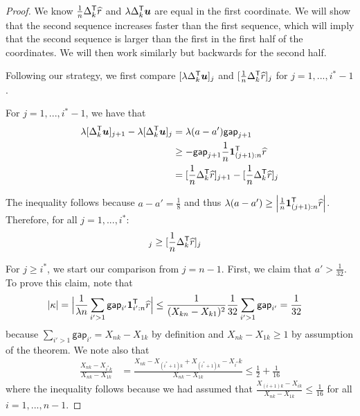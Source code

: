 \documentclass[12pt,pdftex,aos,noinfoline,addressasfootnote]{imsart}
\begin{document}
\begin{proof}
We know $\frac{1}{n} \Delta_k^{\mathsf{T}} \widehat{r}$ and $\lambda \Delta_k^{\mathsf{T}} \mbox{\boldmath $u$}$ are equal in the first coordinate. We will show that the second sequence increases faster than the first sequence, which will imply that the second sequence is larger than the first in the first half of the coordinates. We will then work similarly but backwards for the second half. 


Following our strategy, we first compare $[\lambda \Delta_k^{\mathsf{T}} \mbox{\boldmath $u$}]_j$ and $[\frac{1}{n} \Delta_k^{\mathsf{T}} \widehat{r}]_j$ for $j=1,..., i^*-1$.

For $j = 1,..., i^*-1$, we have that
\begin{align*}
\lambda [ \Delta_k^{\mathsf{T}} \mbox{\boldmath $u$}]_{j+1} - \lambda [ \Delta_k^{\mathsf{T}} \mbox{\boldmath $u$}]_{j} &= \lambda (a - a') \mathsf{gap}_{j+1} \\
 &\geq -\mathsf{gap}_{j+1} \frac{1}{n} \mbox{\boldmath $1$}_{(j+1):n}^{\mathsf{T}} \widehat{r} \\
& = [ \frac{1}{n} \Delta_k^{\mathsf{T}} \widehat{r} ]_{j+1} - [ \frac{1}{n} \Delta_k^{\mathsf{T}} \widehat{r} ]_{j}
\end{align*}

The inequality follows because $a - a' = \frac{1}{8}$ and thus $\lambda (a - a') \geq \left| \frac{1}{n} \mbox{\boldmath $1$}_{(j+1):n}^{\mathsf{T}} \widehat{r} \right|$. Therefore, for all $j = 1,...,i^*$:
\begin{align*}
[ \lambda \Delta_k^\tran \mathbf{u}]_j &\geq [ \frac{1}{n} \Delta_k^\tran \hat{r} ]_j
\end{align*}

For $j \geq i^*$, we start our comparison from $j=n-1$. First, we claim that $a' > \frac{1}{32}$. To prove this claim, note that
\begin{align}
|\kappa| &= \Big|\frac{1}{\lambda n} \sum_{i' > 1} \mathsf{gap}_{i'} \mbox{\boldmath $1$}_{i':n}^{\mathsf{T}} \widehat{r}\Big| \leq \frac{1}{(X_{kn} - X_{k1})^2}\frac{1}{32} \sum_{i' > 1} \mathsf{gap}_{i'} 
 = \frac{1}{32} 
\end{align}
because $\sum_{i'>1} \mathsf{gap}_{i'} = X_{nk} - X_{1k}$ by definition and $X_{nk} - X_{1k} \geq 1$ by assumption of the theorem. We note also that
\begin{align*}
\frac{X_{nk} - X_{i^*k}}{X_{nk} - X_{1k}} &= \frac{X_{nk} - X_{(i^*+1)k} + X_{(i^*+1)k} - X_{i^*}k}{X_{nk} - X_{1k}} \leq \frac{1}{2} + \frac{1}{16}
\end{align*}
where the inequality follows because we had assumed that $\frac{X_{(i+1)k} - X_{ik}}{X_{nk} - X_{1k}} \leq \frac{1}{16}$ for all $i = 1,...,n-1$.


\end{proof}
\end{document}
